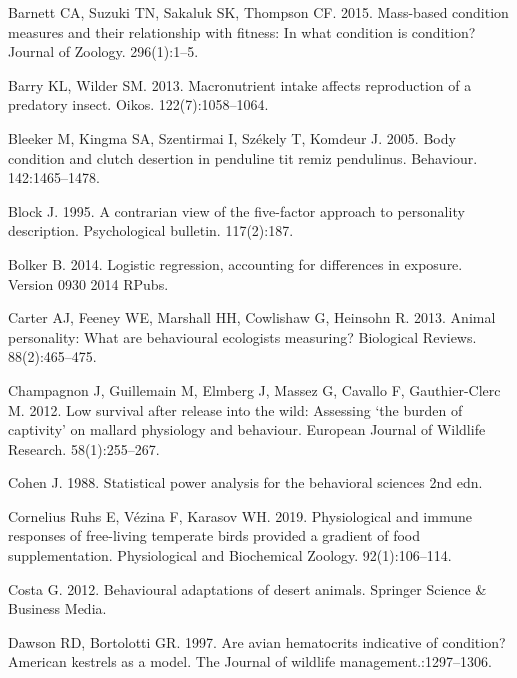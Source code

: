 \documentclass[
]{article}
\begin{document}
\leavevmode\hypertarget{ref-barnett2015mass}{}%
Barnett CA, Suzuki TN, Sakaluk SK, Thompson CF. 2015. Mass-based
condition measures and their relationship with fitness: In what
condition is condition? Journal of Zoology. 296(1):1--5.

\leavevmode\hypertarget{ref-barry2013macronutrient}{}%
Barry KL, Wilder SM. 2013. Macronutrient intake affects reproduction of
a predatory insect. Oikos. 122(7):1058--1064.

\leavevmode\hypertarget{ref-bleeker2005body}{}%
Bleeker M, Kingma SA, Szentirmai I, Székely T, Komdeur J. 2005. Body
condition and clutch desertion in penduline tit remiz pendulinus.
Behaviour. 142:1465--1478.

\leavevmode\hypertarget{ref-block1995contrarian}{}%
Block J. 1995. A contrarian view of the five-factor approach to
personality description. Psychological bulletin. 117(2):187.

\leavevmode\hypertarget{ref-bolker2014logistic}{}%
Bolker B. 2014. Logistic regression, accounting for differences in
exposure. Version 0930 2014 RPubs.

\leavevmode\hypertarget{ref-carter2013animal}{}%
Carter AJ, Feeney WE, Marshall HH, Cowlishaw G, Heinsohn R. 2013. Animal
personality: What are behavioural ecologists measuring? Biological
Reviews. 88(2):465--475.

\leavevmode\hypertarget{ref-champagnon2012low}{}%
Champagnon J, Guillemain M, Elmberg J, Massez G, Cavallo F,
Gauthier-Clerc M. 2012. Low survival after release into the wild:
Assessing `the burden of captivity' on mallard physiology and behaviour.
European Journal of Wildlife Research. 58(1):255--267.

\leavevmode\hypertarget{ref-cohen1988statistical}{}%
Cohen J. 1988. Statistical power analysis for the behavioral sciences
2nd edn.

\leavevmode\hypertarget{ref-cornelius2019physiological}{}%
Cornelius Ruhs E, Vézina F, Karasov WH. 2019. Physiological and immune
responses of free-living temperate birds provided a gradient of food
supplementation. Physiological and Biochemical Zoology. 92(1):106--114.

\leavevmode\hypertarget{ref-costa2012behavioural}{}%
Costa G. 2012. Behavioural adaptations of desert animals. Springer
Science \& Business Media.

\leavevmode\hypertarget{ref-dawson1997avian}{}%
Dawson RD, Bortolotti GR. 1997. Are avian hematocrits indicative of
condition? American kestrels as a model. The Journal of wildlife
management.:1297--1306.
\end{document}
